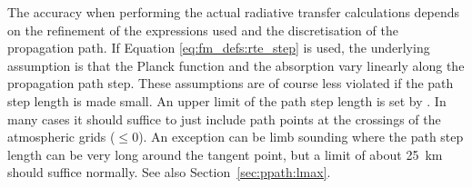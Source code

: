 The accuracy when performing the actual radiative transfer calculations depends
on the refinement of the expressions used and the discretisation of the
propagation path. If Equation \ref{eq:fm_defs:rte_step} is used, the
underlying assumption is that the Planck function and the absorption vary
linearly along the propagation path step. These assumptions are of course less
violated if the path step length is made small. An upper limit of the path step
length is set by . In many cases it should suffice to
just include path points at the crossings of the atmospheric grids
($\leq0$). An exception can be limb sounding where the
path step length can be very long around the tangent point, but a limit of
about 25~km should suffice normally. See also Section~\ref{sec:ppath:lmax}.


